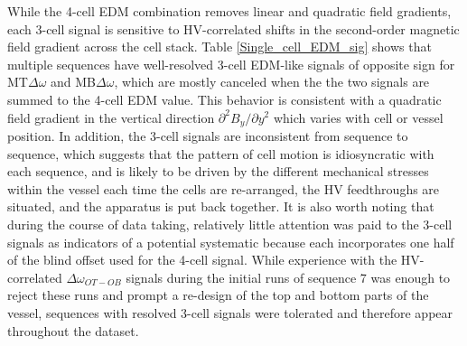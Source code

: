 \documentclass [10pt, twoside] {uwthesis}[2012/04/02]
\begin{document}
While the 4-cell EDM combination removes linear and quadratic field gradients, each 3-cell signal is sensitive to HV-correlated shifts in the second-order magnetic field gradient across the cell stack. Table \ref{Single_cell_EDM_sig} shows that multiple sequences have well-resolved 3-cell EDM-like signals of opposite sign for MT$\Delta\omega$ and MB$\Delta\omega$, which are mostly canceled when the the two signals are summed to the 4-cell EDM value. This behavior is consistent with a quadratic field gradient in the vertical direction $\partial^2 B_y/\partial y^2$ which varies with cell or vessel position. In addition, the 3-cell signals are inconsistent from sequence to sequence, which suggests that the pattern of cell motion is idiosyncratic with each sequence, and is likely to be driven by the different mechanical stresses within the vessel each time the cells are re-arranged, the HV feedthroughs are situated, and the apparatus is put back together. It is also worth noting that during the course of data taking, relatively little attention was paid to the 3-cell signals as indicators of a potential systematic because each incorporates one half of the blind offset used for the 4-cell signal. While experience with the HV-correlated $\Delta\omega_{OT-OB}$ signals during the initial runs of sequence 7 was enough to reject these runs and prompt a re-design of the top and bottom parts of the vessel, sequences with resolved 3-cell signals were tolerated and therefore appear throughout the dataset.
\end{document}
